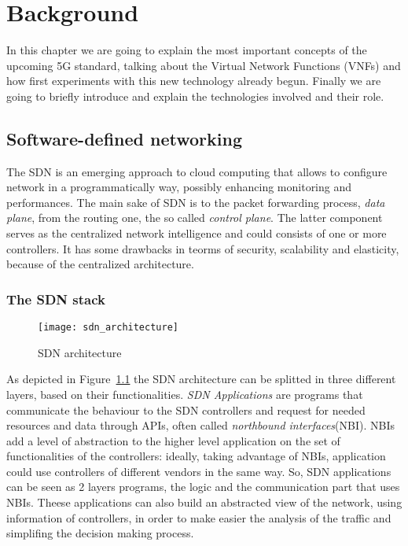 \chapter{Background}
\label{chap:background}

In this chapter we are going to explain the most important concepts of the 
upcoming 5G standard, talking about the Virtual Network Functions (VNFs) and 
how first experiments with this new technology already begun. Finally we are 
going to briefly introduce and explain the technologies involved and their role.

\section{Software-defined networking}
The SDN is an emerging approach to cloud computing that allows to configure
network in a programmatically way, possibly enhancing monitoring and
performances. The main sake of SDN is to the packet forwarding process,
\emph{data plane}, from the routing one, the so called \emph{control plane}.
The latter component serves as the centralized network intelligence and could
consists of one or more controllers. It has some drawbacks in teorms of
security, scalability and elasticity, because of the centralized architecture.

\subsection{The SDN stack}
\begin{figure}[t]
 \centering
 \texttt{[image: sdn\_architecture]}
 \caption{SDN architecture}
 \label{chap:background:img:sdn_architecture}
\end{figure}
As depicted in Figure~\ref{chap:background:img:sdn_architecture} the SDN
architecture can be splitted in three different layers, based on their
functionalities. \emph{SDN Applications} are programs that communicate the
behaviour to the SDN controllers and request for needed resources and data
through APIs, often called \emph{northbound interfaces}(NBI). NBIs add a level
of abstraction to the higher level application on the set of functionalities of
the controllers: ideally, taking advantage of NBIs, application could use
controllers of different vendors in the same way. So, SDN applications can be
seen as 2 layers programs, the logic and the communication part that uses NBIs.
Theese applications can also build an abstracted view of the network, using
information of controllers, in order to make easier the analysis of the traffic
and simplifing the decision making process.

